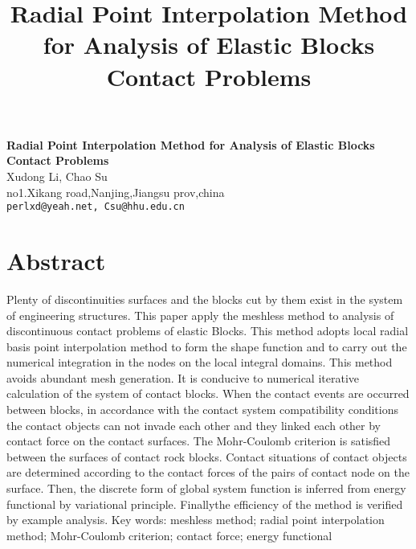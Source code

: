 \title{Radial Point Interpolation Method for Analysis of  Elastic Blocks Contact Problems}
\author{} \institute{}

\begin{center}

\textbf{\Large Radial Point Interpolation Method for Analysis of  Elastic Blocks Contact Problems}\\
\vspace{10mm}
{\large Xudong Li, Chao Su}\\
no1.Xikang road,Nanjing,Jiangsu prov,china\\
{\tt perlxd@yeah.net, Csu@hhu.edu.cn}

\end{center}

\section*{Abstract}

Plenty of discontinuities surfaces and the blocks cut by them exist in the system of engineering structures. This paper apply the meshless method to analysis of discontinuous contact problems of elastic Blocks. This method adopts local radial basis point interpolation method to form the shape function and to carry out the numerical integration in the nodes on the local integral domains. This method avoids abundant mesh generation. It is conducive to numerical iterative calculation of the system of contact blocks. When the contact events are occurred between blocks, in accordance with the contact system compatibility conditions the contact objects can not invade each other and they linked each other by contact force on the contact surfaces. The Mohr-Coulomb criterion is satisfied between the surfaces of contact rock blocks. Contact situations of contact objects are determined according to the contact forces of the pairs of contact node on the surface. Then, the discrete form of global system function is inferred from energy functional by variational principle. Finallythe efficiency of the method is verified by example analysis.
Key words: meshless method; radial point interpolation method; Mohr-Coulomb criterion; contact force; energy functional

